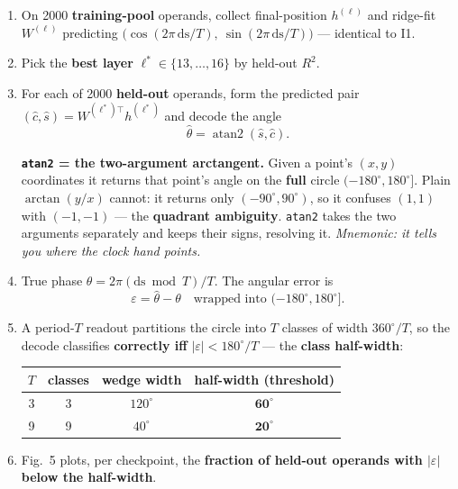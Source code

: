 \documentclass[11pt]{article}
\newcommand{\ds}{\mathrm{ds}}
\begin{document}
\begin{enumerate}[leftmargin=*,itemsep=3pt]
\item On 2000 \textbf{training-pool} operands, collect final-position $h^{(\ell)}$
and ridge-fit $W^{(\ell)}$ predicting
$\big(\cos(2\pi\,\ds/T),\ \sin(2\pi\,\ds/T)\big)$ --- identical to I1.
\item Pick the \textbf{best layer} $\ell^\ast \in \{13,\dots,16\}$ by held-out $R^2$.
\item For each of 2000 \textbf{held-out} operands, form the predicted pair
$(\hat{c}, \hat{s}) = W^{(\ell^\ast)\top} h^{(\ell^\ast)}$ and decode the angle
\[
\hat{\theta} = \operatorname{atan2}(\hat{s}, \hat{c}).
\]

\textbf{\texttt{atan2} = the two-argument arctangent.} Given a point's $(x,y)$
coordinates it returns that point's angle on the \textbf{full} circle
$(-180^\circ, 180^\circ]$. Plain $\arctan(y/x)$ cannot: it returns only
$(-90^\circ, 90^\circ)$, so it confuses $(1,1)$ with $(-1,-1)$ --- the
\textbf{quadrant ambiguity}. \texttt{atan2} takes the two arguments separately and
keeps their signs, resolving it.
\emph{Mnemonic: it tells you where the clock hand points.}

\item True phase $\theta = 2\pi(\ds \bmod T)/T$. The angular error is
\[
\varepsilon = \hat{\theta} - \theta \quad\text{wrapped into } (-180^\circ, 180^\circ].
\]

\item A period-$T$ readout partitions the circle into $T$ classes of width
$360^\circ/T$, so the decode classifies \textbf{correctly iff}
$|\varepsilon| < 180^\circ/T$ --- the \textbf{class half-width}:

\begin{center}
\begin{tabular}{@{}cccc@{}}
\toprule
$T$ & classes & wedge width & \textbf{half-width (threshold)} \\
\midrule
3 & 3 & $120^\circ$ & $\mathbf{60^\circ}$ \\
9 & 9 & $40^\circ$  & $\mathbf{20^\circ}$ \\
\bottomrule
\end{tabular}
\end{center}

\item Fig.~5 plots, per checkpoint, the \textbf{fraction of held-out operands with
$|\varepsilon|$ below the half-width}.
\end{enumerate}
\end{document}
